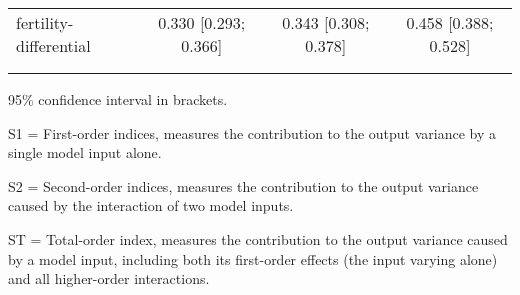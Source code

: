 \begin{table}[htp]
\begin{threeparttable}
\begin{tabular}{lccc}
	  \hspace{1.5em} fertility-differential & 0.330 [0.293; 0.366]   & 0.343 [0.308; 0.378]   & 0.458 [0.388; 0.528] \\
	 \\
    \addlinespace
    \hline
    \end{tabular}
    \begin{tablenotes}
    \scriptsize
    \item 95\% confidence interval in brackets.
    \item S1 = First-order indices,  measures the contribution to the output variance by a single model input alone.
    \item S2 = Second-order indices,  measures the contribution to the output variance caused by the interaction of two model inputs.
    \item ST = Total-order index, measures the contribution to the output variance caused by a model input, including both its first-order effects (the input varying alone) and all higher-order interactions.
    \end{tablenotes}
    \end{threeparttable}
    \end{table}